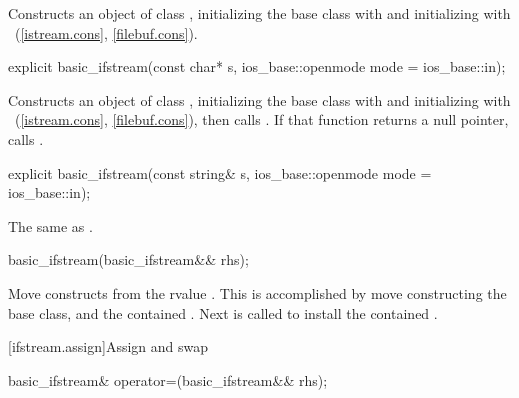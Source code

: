 \begin{itemdescr}
\pnum
\effects
Constructs an object of class
,
initializing the base class with
and initializing  with
~(\ref{istream.cons},
\ref{filebuf.cons}).
\end{itemdescr}

%
\begin{itemdecl}
explicit basic_ifstream(const char* s,
                        ios_base::openmode mode = ios_base::in);
\end{itemdecl}

\begin{itemdescr}
\pnum
\effects
Constructs an object of class
,
initializing the base class with
and initializing  with
~(\ref{istream.cons},
\ref{filebuf.cons}),
then calls
.
If that function returns a null pointer, calls
.
\end{itemdescr}

%
\begin{itemdecl}
explicit basic_ifstream(const string& s,
                        ios_base::openmode mode = ios_base::in);
\end{itemdecl}

\begin{itemdescr}
\pnum
\effects The same as .
\end{itemdescr}

%
\begin{itemdecl}
basic_ifstream(basic_ifstream&& rhs);
\end{itemdecl}

\begin{itemdescr}
\pnum
\effects Move constructs from the rvalue . This
is accomplished by move constructing the base class, and the contained
. Next
 is called to install
the contained .
\end{itemdescr}

[ifstream.assign]{Assign and swap}

%
\begin{itemdecl}
basic_ifstream& operator=(basic_ifstream&& rhs);
\end{itemdecl}

